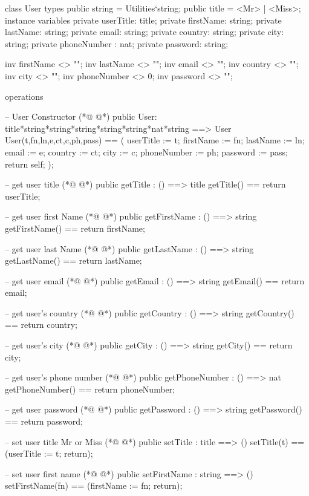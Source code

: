 \begin{vdmpp}[breaklines=true]
class User
types
 public string = Utilities`string;
 public title = <Mr> | <Miss>;
instance variables
 private userTitle: title;
  private firstName: string;
  private lastName: string;
  private email: string;
  private country: string;
  private city: string;
  private phoneNumber : nat;
  private password: string;
        
  inv firstName <> "";
  inv lastName <> "";
  inv email <> "";
  inv country <> "";
  inv city <> "";
  inv phoneNumber <> 0;
  inv password <> "";
        
operations

 -- User Constructor
(*@
\label{User:26}
@*)
 public User: title*string*string*string*string*string*nat*string ==> User
   User(t,fn,ln,e,ct,c,ph,pass) == 
   (
   userTitle := t;
    firstName := fn;
    lastName := ln;
    email := e;
    country := ct;
    city := c;
    phoneNumber := ph;
  password := pass;
  return self;
  );
  
 -- get user title
(*@
\label{getTitle:41}
@*)
 public getTitle : () ==> title
  getTitle() == return userTitle;
  
 -- get user first Name
(*@
\label{getFirstName:45}
@*)
 public getFirstName : () ==> string
  getFirstName() == return firstName;
  
 -- get user last Name
(*@
\label{getLastName:49}
@*)
 public getLastName : () ==> string
  getLastName() == return lastName;
  
 -- get user email
(*@
\label{getEmail:53}
@*)
 public getEmail : () ==> string
  getEmail() == return  email;
  
 -- get user's country
(*@
\label{getCountry:57}
@*)
 public getCountry : () ==> string
  getCountry() == return country;
  
 -- get user's city
(*@
\label{getCity:61}
@*)
 public getCity : () ==> string
  getCity() == return city;
  
 -- get user's phone number
(*@
\label{getPhoneNumber:65}
@*)
 public getPhoneNumber : () ==> nat
  getPhoneNumber() == return phoneNumber;
  
 -- get user password
(*@
\label{getPassword:69}
@*)
 public getPassword : () ==> string
  getPassword() == return password;
 
 -- set user title Mr or Miss
(*@
\label{setTitle:73}
@*)
 public setTitle : title ==> ()
  setTitle(t) == (userTitle := t; return);
  
 -- set user first name
(*@
\label{setFirstName:77}
@*)
 public setFirstName : string ==> ()
  setFirstName(fn) == (firstName := fn; return);
 

\end{vdmpp}

